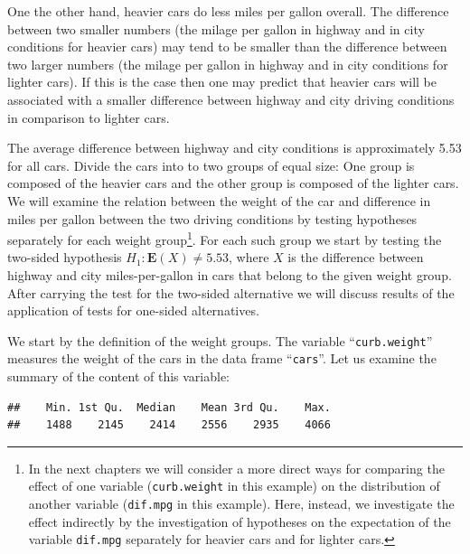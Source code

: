 \documentclass[
]{krantz}
\makeatletter
\newenvironment{Shaded}{\begin{snugshade}}{\end{snugshade}}
\newcommand{\KeywordTok}[1]{\textcolor[rgb]{0.13,0.29,0.53}{\textbf{#1}}}
\newcommand{\NormalTok}[1]{#1}
\newcommand{\OperatorTok}[1]{\textcolor[rgb]{0.81,0.36,0.00}{\textbf{#1}}}
\newcommand{\Expec}{\mathbf{E}}
\newenvironment{kframe}{%
\medskip{}
\setlength{\fboxsep}{.8em}
 \def\at@end@of@kframe{}%
 \ifinner\ifhmode%
  \def\at@end@of@kframe{\end{minipage}}%
  \begin{minipage}{\columnwidth}%
 \fi\fi%
 \def\FrameCommand##1{\hskip\@totalleftmargin \hskip-\fboxsep
 \colorbox{shadecolor}{##1}\hskip-\fboxsep
     \hskip-\linewidth \hskip-\@totalleftmargin \hskip\columnwidth}%
 \MakeFramed {\advance\hsize-\width
   \@totalleftmargin\z@ \linewidth\hsize
   \@setminipage}}%
 {\par\unskip\endMakeFramed%
 \at@end@of@kframe}
\renewenvironment{Shaded}{\begin{kframe}}{\end{kframe}}
\theoremstyle{definition}
\theoremstyle{definition}
\theoremstyle{definition}
\theoremstyle{remark}
\makeatother
\begin{document}
One the other hand, heavier cars do less miles per gallon overall. The
difference between two smaller numbers (the milage per gallon in highway
and in city conditions for heavier cars) may tend to be smaller than the
difference between two larger numbers (the milage per gallon in highway
and in city conditions for lighter cars). If this is the case then one
may predict that heavier cars will be associated with a smaller
difference between highway and city driving conditions in comparison to
lighter cars.

The average difference between highway and city conditions is
approximately 5.53 for all cars. Divide the cars into to two groups of
equal size: One group is composed of the heavier cars and the other
group is composed of the lighter cars. We will examine the relation
between the weight of the car and difference in miles per gallon between
the two driving conditions by testing hypotheses separately for each
weight group\footnote{In the next chapters we will consider a more direct ways for
  comparing the effect of one variable (\texttt{curb.weight} in this example)
  on the distribution of another variable (\texttt{dif.mpg} in this example).
  Here, instead, we investigate the effect indirectly by the
  investigation of hypotheses on the expectation of the variable
  \texttt{dif.mpg} separately for heavier cars and for lighter cars.}. For each such group we start by testing the two-sided
hypothesis \(H_1:\Expec(X) \not = 5.53\), where \(X\) is the difference
between highway and city miles-per-gallon in cars that belong to the
given weight group. After carrying the test for the two-sided
alternative we will discuss results of the application of tests for
one-sided alternatives.

We start by the definition of the weight groups. The variable
``\texttt{curb.weight}'' measures the weight of the cars in the data frame
``\texttt{cars}''. Let us examine the summary of the content of this variable:

\begin{Shaded}
\end{Shaded}

\begin{verbatim}
##    Min. 1st Qu.  Median    Mean 3rd Qu.    Max. 
##    1488    2145    2414    2556    2935    4066
\end{verbatim}
\end{document}
